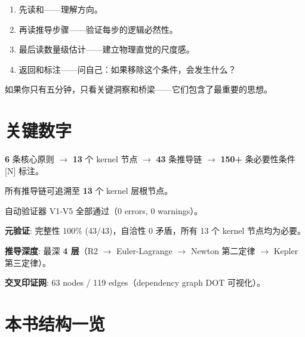 \begin{insightbox}[如何最大化收获]
  \begin{enumerate}
    \item 先读和——理解方向。
    \item 再读推导步骤——验证每步的逻辑必然性。
    \item 最后读数量级估计——建立物理直觉的尺度感。
    \item 返回\fbox{[N]}和\fbox{[S]}标注——问自己：如果移除这个条件，会发生什么？
  \end{enumerate}
  如果你只有五分钟，只看关键洞察和桥梁——它们包含了最重要的思想。
\end{insightbox}

\section{关键数字}

\begin{notebox}[本书核心统计]
  \begin{center}
  \textbf{6} 条核心原则 $\to$ \textbf{13} 个 kernel 节点 $\to$ \textbf{43} 条推导链 $\to$ \textbf{150+} 条必要性条件 [N] 标注。

  所有推导链可追溯至 \textbf{13} 个 kernel 层根节点。

  自动验证器 V1-V5 全部通过（0 errors, 0 warnings）。

  \textbf{元验证}: 完整性 100\% (43/43)，自洽性 0 矛盾，所有 13 个 kernel 节点均为必要。

  \textbf{推导深度}: 最深 \textbf{4 层}（R2 $\to$ Euler-Lagrange $\to$ Newton 第二定律 $\to$ Kepler 第三定律）。

  \textbf{交叉印证网}: 63 nodes / 119 edges（dependency graph DOT 可视化）。
  \end{center}
\end{notebox}

\section{本书结构一览}

